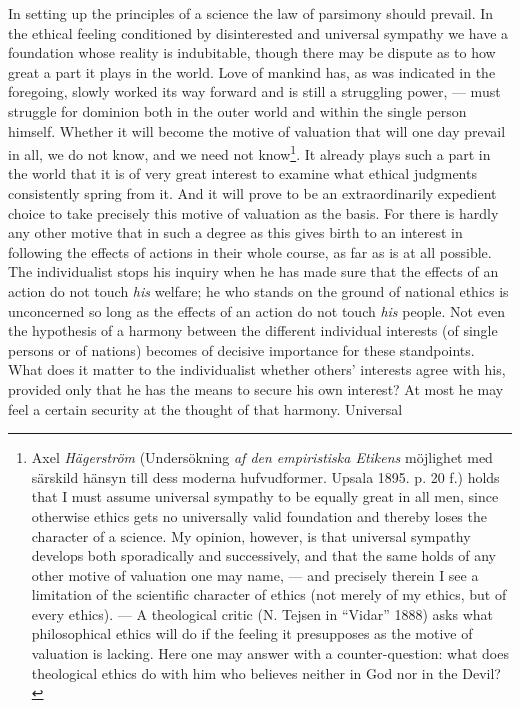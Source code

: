 \documentclass[12pt,a4paper,openany]{book}
\newcommand{\opage}[1]{\marginnote{\footnotesize\textit{[#1]}}}
\begin{document}
In setting up the principles of a science the law of parsimony should prevail. In the ethical feeling
conditioned by disinterested and universal sympathy we have a foundation whose reality is
indubitable, though there may be dispute as to how great a part it plays in the world. Love of
mankind has, as was indicated in the foregoing, slowly worked its way forward and is still a
struggling power, --- must struggle for dominion both in the outer world and within the single person
himself. Whether it will become the motive of valuation that will one day prevail in all, we do not
know, and we need not know\footnote[2]{Axel \emph{Hägerström} (Undersökning \textit{af den empiristiska
Etikens} möjlighet med särskild hänsyn till dess moderna hufvudformer. Upsala 1895. p. 20 f.) holds
that I must assume universal sympathy to be equally great in all men, since otherwise ethics gets no
universally valid foundation and thereby loses the character of a science. My opinion, however, is
that universal sympathy develops both sporadically and successively, and that the same holds of any
other motive of valuation one may name, --- and precisely therein I see a limitation of the scientific
character of ethics (not merely of my ethics, but of every ethics). --- A theological critic (N.
Tejsen in ``Vidar'' 1888) asks what philosophical ethics will do if the feeling it presupposes as the
motive of valuation is lacking. Here one may answer with a counter-question: what does theological
ethics do with him who believes neither in God nor in the Devil?}. It
\opage{58}already plays such a part in the world that it is of very great interest to examine what ethical
judgments consistently spring from it. And it will prove to be an extraordinarily expedient choice to
take precisely this motive of valuation as the basis. For there is hardly any other motive that in
such a degree as this gives birth to an interest in following the effects of actions in their whole
course, as far as is at all possible. The individualist stops his inquiry when he has made sure that
the effects of an action do not touch \textit{his} welfare; he who stands on the ground of national
ethics is unconcerned so long as the effects of an action do not touch \textit{his} people. Not even
the hypothesis of a harmony between the different individual interests (of single persons or of
nations) becomes of decisive importance for these standpoints. What does it matter to the
individualist whether others' interests agree with his, provided only that he has the means to secure
his own interest? At most he may feel a certain security at the thought of that harmony. Universal
\end{document}
